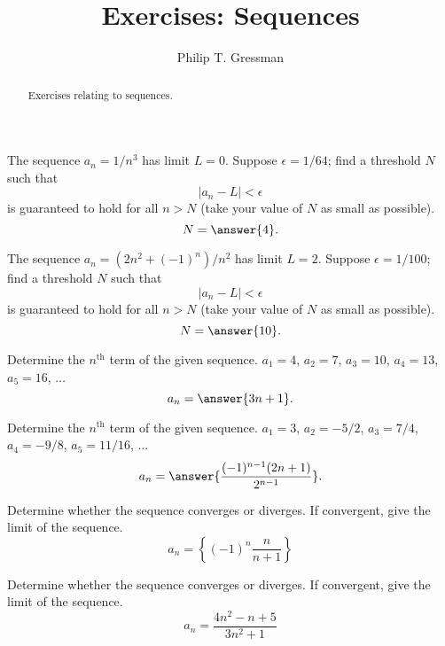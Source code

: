 \documentclass{ximera}
\title{Exercises: Sequences}
\author{Philip T. Gressman}
\begin{document}
\begin{abstract}
Exercises relating to sequences.
\end{abstract}
\maketitle

\begin{exercise}
The sequence $a_n = 1/n^3$ has limit $L = 0$. Suppose $\epsilon = 1/64$; find a threshold $N$ such that
\[ |a_n -L| < \epsilon \]
is guaranteed to hold for all $n > N$ (take your value of $N$ as small as possible).
\[ N = \answer{4}. \]
\end{exercise}

\begin{exercise}
The sequence $a_n = (2n^2 + (-1)^n)/n^2$ has limit $L = 2$. Suppose $\epsilon = 1/100$; find a threshold $N$ such that
\[ |a_n -L| < \epsilon \]
is guaranteed to hold for all $n > N$ (take your value of $N$ as small as possible).
\[ N = \answer{10}. \]
\end{exercise}

\begin{exercise}%
Determine the \(n^\text{th}\) term of the given sequence. $a_1 = 4$, $a_2 = 7$, $a_3 = 10$, $a_4 = 13$, $a_5 = 16$, \(\ldots\)
\[ a_n = \answer{3n+1}. \]
\end{exercise}
\begin{exercise}%
Determine the \(n^\text{th}\) term of the given sequence. $a_1 = 3$, $a_2 = -5/2$, $a_3 = 7/4$, $a_4 = -9/8$, $a_5 = 11/16$, \(\ldots\)
\[ a_n = \answer{\frac{(-1)^{n-1} (2n+1)}{2^{n-1}}}. \]
\end{exercise}

\begin{exercise}%
Determine whether the sequence converges or diverges. If convergent, give the limit of the sequence. 
\[ a_n = \left\{(-1)^n\frac{n}{n+1}\right\} \]
\begin{multipleChoice}
\end{multipleChoice}
\end{exercise}

\begin{exercise}%
Determine whether the sequence converges or diverges. If convergent, give the limit of the sequence. 
\[ a_n = \frac{4n^2-n+5}{3n^2+1} \]
\begin{multipleChoice}
\end{multipleChoice}
\end{exercise}
\end{document}
